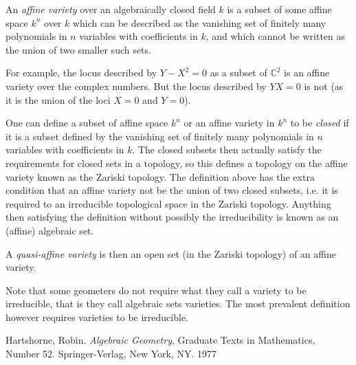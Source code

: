 \documentclass[12pt]{article}
\begin{document}
An {\em affine variety} over an algebraically closed field $k$ is a subset of some affine space $k^n$ over $k$ which can be described as the vanishing set of finitely many polynomials in $n$ variables with coefficients in $k$, and which cannot be written as the union of two smaller such sets.

For example, the locus described by $Y - X^2 = 0$ as a subset of $\mathbb{C}^2$ is an affine variety over the complex numbers.  But the locus described by $YX = 0$ is not (as it is the union of the loci $X = 0$ and $Y = 0$).

One can define a subset of affine space $k^n$ or an affine variety in $k^n$ to be \emph{closed} if it is a subset defined by the vanishing set of finitely many polynomials in $n$ variables with coefficients in $k$.  The closed subsets then actually satisfy the requirements for closed sets in a topology, so this defines a topology on the affine variety known as the Zariski topology.  The definition above has the  extra condition that an affine variety not be the union of two closed subsets, i.e. it is required to an irreducible topological space in the Zariski topology.  Anything then satisfying the definition without possibly the irreducibility is known as an (affine) algebraic set.

A {\em quasi-affine variety} is then an open set (in the Zariski topology) of an affine variety.

Note that some geometers do not require what they call a variety to be irreducible, that is they call algebraic sets varieties.  The most prevalent definition however requires varieties to be irreducible.


\begin{thebibliography}{9}
 Hartshorne, Robin.  \emph{Algebraic Geometry}, Graduate Texts in Mathematics, Number 52.  Springer-Verlag, New York, NY.  1977
\end{thebibliography}
\end{document}
